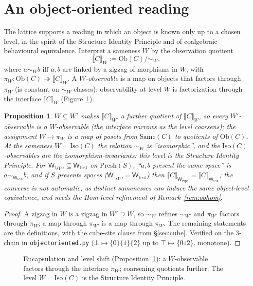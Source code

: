 \documentclass[11pt]{amsart}
\newtheorem{prop}[thm]{Proposition}
\theoremstyle{definition}
\newcommand{\Same}{\mathrm{Same}}
\newcommand{\Ob}{\mathrm{Ob}}
\newcommand{\Iso}{\mathrm{Iso}}
\newcommand{\Wtest}{\mathsf{W}_{\mathrm{test}}}
\newcommand{\Wtype}{\mathsf{W}_{\mathrm{type}}}
\newcommand{\Presh}{\mathrm{Presh}}
\begin{document}
\section{An object-oriented reading}\label{sec:oo}

The lattice supports a reading in which an object is known only up to a chosen
level, in the spirit of the Structure Identity Principle and of coalgebraic
behavioural equivalence. Interpret a sameness $W$ by the observation quotient
\[
\llbracket C\rrbracket_W:=\Ob(C)/\!\sim_W,
\]
where $a\sim_W b$ iff $a,b$ are linked by a zigzag of morphisms in $W$,
with $\pi_W\colon\Ob(C)\twoheadrightarrow\llbracket C\rrbracket_W$. A
\emph{$W$-observable} is a map on objects that factors through $\pi_W$
(is constant on $\sim_W$-classes): observability at level $W$ is factorization
through the interface $\llbracket C\rrbracket_W$ (Figure~\ref{fig:oo}).

\begin{prop}\label{prop:oo}
$W\subseteq W'$ makes $\llbracket C\rrbracket_{W'}$ a further quotient of
$\llbracket C\rrbracket_W$, so every $W'$-observable is a $W$-observable (the
interface narrows as the level coarsens); the assignment $W\mapsto\pi_W$ is a map
of posets from $\Same(C)$ to quotients of $\Ob(C)$. At the sameness $W=\Iso(C)$
the relation $\sim_W$ is ``isomorphic'', and the $\Iso(C)$-observables are the
isomorphism-invariants: this level is the Structure Identity Principle. For
$\Wtype\subseteq\Wtest$ on $\Presh(S)$, ``$a,b$ present the same space'' is
$a\sim_{\Wtest}b$, and if $S$ presents spaces
($\Wtype=\Wtest$) then $\llbracket C\rrbracket_{\Wtype}=
\llbracket C\rrbracket_{\Wtest}$; the converse is not automatic, as distinct
samenesses can induce the same object-level equivalence, and needs the Hom-level
refinement of Remark~\ref{rem:oohom}.
\end{prop}

\begin{proof}
A zigzag in $W$ is a zigzag in $W'\supseteq W$, so $\sim_W$ refines $\sim_{W'}$
and $\pi_{W'}$ factors through $\pi_W$; a map through $\pi_{W'}$ is a map through
$\pi_W$. The remaining statements are the definitions, with the cube-site clause
from \S\ref{sec:cube}. Verified on the $3$-chain in
\texttt{objectoriented.py} ($\bot\mapsto\{0\}\{1\}\{2\}$ up to
$\top\mapsto\{012\}$, monotone).
\end{proof}

\begin{figure}[ht]
\centering
{}
\caption{Encapsulation and level shift (Proposition~\ref{prop:oo}): a
$W$-observable factors through the interface $\pi_W$; coarsening quotients
further. The level $W=\Iso(C)$ is the Structure Identity Principle.}
\label{fig:oo}
\end{figure}
\end{document}
